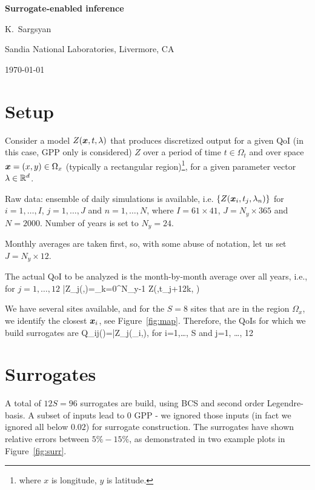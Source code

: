 \documentclass[12pt]{article}
\begin{document}
\centerline{\Large\bf Surrogate-enabled inference}
\medskip
\centerline{K.~Sargsyan}
\centerline{Sandia National Laboratories, Livermore, CA}
\centerline{\today}
\medskip


\section{Setup} \label{sec:setup}

Consider a model $Z({\mbox{\boldmath $x$}}, t, \lambda)$ that produces discretized output for a given QoI (in this case, GPP only is considered) $Z$
over a period of time $t\in \Omega_t$ and over space ${\mbox{\boldmath $x$}}=(x,y)\in \Omega_x$
(typically a rectangular region)\footnote{where $x$ is longitude, $y$ is
latitude.}, for a given parameter vector $\lambda\in \mathbb{R}^d$.

\bi
\item Raw data: ensemble of daily simulations is available, i.e. $\{Z({\mbox{\boldmath $x$}}_i, t_j, \lambda_n)\}$
for $i=1,\dots, I$, $j=1,\dots, J$ and $n=1, \dots, N$, where $I=61\times 41$,
$J=N_y\times 365$ and $N=2000$. Number of years is set to $N_y=24$.
\item Monthly averages are taken first, so, with some abuse of notation,
let us set $J=N_y \times 12$.
\item The actual QoI to be analyzed is the month-by-month average over all years, i.e., for $j=1,\dots, 12$
\be
\bar{Z_j}(\vx,\lambda)=\sum_{k=0}^{N_y-1} Z(\vx,t_{j+12k}, \lambda)
\ee
\item We have several sites available, and for the $S=8$ sites that are in the region $\Omega_x$, we identify the closest ${\mbox{\boldmath $x$}}_i$, see Figure~\ref{fig:map}. Therefore, the QoIs for which we build surrogates are
\be
Q_{ij}(\lambda)=\bar{Z_j}(\vx_i,\lambda), \textrm{  for } i=1,\dots, S \textrm{ and  } j=1, \dots, 12
\ee
\ei

\section{Surrogates}

A total of $12S=96$ surrogates are build, using BCS and second order Legendre-basis. A subset of inputs lead to $0$ GPP - we ignored those inputs (in fact we ignored all below $0.02$) for surrogate construction. The surrogates have shown relative errors between $5\%-15\%$, as demonstrated in two example plots in Figure~\ref{fig:surr}.
\end{document}
